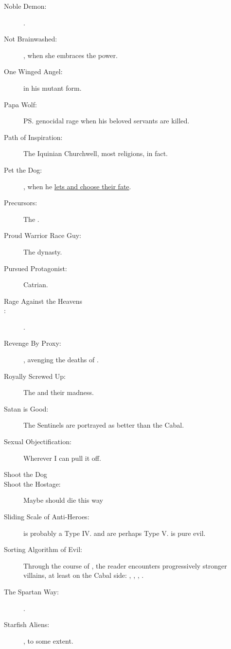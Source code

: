 \begin{flushleft}
\begin{description}
  \item[Noble Demon:] \Ishnaruchaefir. 
  \item[Not Brainwashed:] 
    \Tiamat, when she embraces the \xsic{} power. 
  \item[One Winged Angel:]
    \Teshrial{} in his mutant form. 
  \item[Papa Wolf:] 
    \ps{\Ishnaruchaefir} genocidal rage when his beloved servants are killed. 
  \item[Path of Inspiration:] 
    The Iquinian Church\prikker well, most religions, in fact. 
  \item[Pet the Dog:] 
    \Secherdamon, when he \hyperref[Secherdamon lets Tiroco and Icor choose their fate]{lets \Tiroco{} and \Icor{} choose their fate}.
  \item[Precursors:] The . 
  \item[Proud Warrior Race Guy:] The \Mystraacht{} dynasty. 
  \item[Pursued Protagonist:] Catrian. 
  \item[Rage Against the Heavens] 
  \item[:] \Sithiyacaan. 
  \item[Revenge By Proxy:] 
    \Ishnaruchaefir, avenging the deaths of . 
  \item[Royally Screwed Up:]
    The \satharioth and their madness. 
  \item[Satan is Good:] 
    The \daemonic{} Sentinels are portrayed as better than the Cabal. 
  \item[Sexual Objectification:] Wherever I can pull it off. 
  \item[Shoot the Dog] 
  \item[Shoot the Hostage:] Maybe  should die this way\prikker
  \item[Sliding Scale of Anti-Heroes:] 
    \Ishnaruchaefir{} is probably a Type IV. 
    \Secherdamon{} and \Azraid{} are perhaps Type V. 
    \Vizsherioch{} is pure evil. 
  \item[Sorting Algorithm of Evil:] 
    Through the course of \SentinelsofMithEmph, the reader encounters progressively stronger villains, at least on the Cabal side: 
    \Teshrial, \Azraid, \Daggerrain, \Voidbringer.
  \item[The Spartan Way:]
    . 
  \item[Starfish Aliens:] 
    \Voyagers, \banes{} to some extent.

\end{description}
\end{flushleft}
